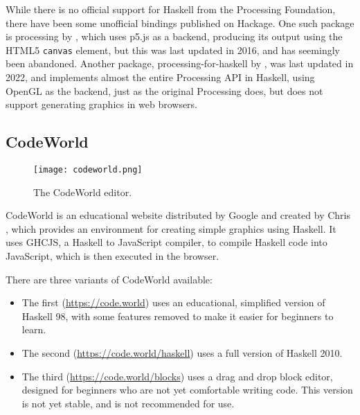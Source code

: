 \documentclass[../main.tex]{subfiles}
\begin{document}
            While there is no official support for Haskell from the Processing Foundation,
                there have been some unofficial bindings published on Hackage.
            One such package is processing by \citet{hackageProcessing}, which uses p5.js
                as a backend, producing its output using the HTML5 \texttt{canvas} element, but
                this was last updated in 2016, and has seemingly been abandoned.
            Another package, processing-for-haskell by \citet{hackageProcessingForHaskell},
                was last updated in 2022, and implements almost the entire Processing API in
                Haskell, using OpenGL as the backend, just as the original Processing does, but
                does not support generating graphics in web browsers.

        \subsection{CodeWorld}
            \begin{figure}[H]
                \centering
                \texttt{[image: codeworld.png]}
                    \caption{The CodeWorld editor.}
                    \label{fig:codeworld}
            \end{figure}

            CodeWorld is an educational website distributed by Google and created by Chris
                \citet{codeWorldGitHub}, which provides an environment for creating simple
                graphics using Haskell.
            It uses GHCJS, a Haskell to JavaScript compiler, to compile Haskell code into
                JavaScript, which is then executed in the browser.

            There are three variants of CodeWorld available:
            \begin{itemize}
                \item The first (\url{https://code.world}) uses an educational, simplified
                      version of Haskell 98, with some features removed to make it easier for
                      beginners to learn.
                \item The second (\url{https://code.world/haskell}) uses a full version of
                      Haskell 2010.
                \item The third (\url{https://code.world/blocks}) uses a drag and drop block
                      editor, designed for beginners who are not yet comfortable writing code.
                      This version is not yet stable, and is not recommended for use.
            \end{itemize}
\end{document}
